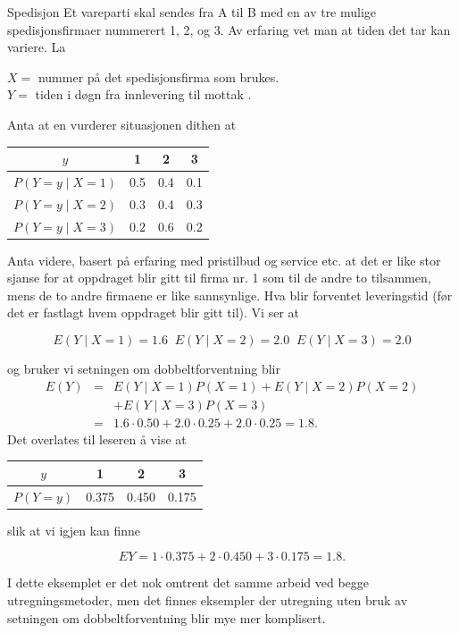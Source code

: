 \begin{eksempel}{Spedisjon}
Et vareparti skal sendes fra A til B med en av tre mulige
spedisjonsfirmaer nummerert 1, 2, og 3. Av erfaring vet man at
tiden det tar kan variere. La

     $X=$ nummer på det spedisjonsfirma som brukes. \\
\indent     $Y=$ tiden i døgn fra innlevering til mottak .

\noindent Anta at en vurderer situasjonen dithen at

\begin{center}
\begin{tabular}{c|ccc}
  $y$& 1 & 2 & 3 \\ \hline
 $P(Y=y \mid X=1)$&0.5&0.4&0.1 \\
 $P(Y=y \mid X=2)$&0.3&0.4&0.3 \\
 $P(Y=y \mid X=3)$&0.2&0.6&0.2 
\end{tabular}
\end{center}
\noindent Anta videre, basert på erfaring med pristilbud og service etc. at
det er like stor sjanse for at oppdraget blir gitt til firma nr.
1 som til de andre to tilsammen, mens de to andre firmaene er
like sannsynlige. Hva blir forventet leveringstid (før det er
fastlagt hvem oppdraget blir gitt til). Vi ser at

\[ E(Y\mid X=1)=1.6 \; \; E(Y\mid X=2)=2.0 \; \; E(Y\mid X=3)=2.0 \]

\noindent og bruker vi setningen om dobbeltforventning blir
\begin{eqnarray*}
E(Y) &=& E(Y\mid X=1)P(X=1)+E(Y\mid X=2)P(X=2) \\
     & & + E(Y\mid X=3)P(X=3) \\
     &=&1.6\cdot 0.50 + 2.0\cdot 0.25 + 2.0\cdot 0.25 = 1.8.
\end{eqnarray*}
\noindent Det overlates til leseren å vise at
\begin{center}
 \begin{tabular}{c|ccc}
 $y$& 1 & 2 & 3 \\ \hline
 $P(Y=y)$ & 0.375 & 0.450 & 0.175
\end{tabular}
\end{center}
\noindent slik at vi igjen kan finne

\[ EY=1\cdot 0.375 + 2\cdot 0.450 + 3\cdot 0.175 = 1.8. \]

\noindent I dette eksemplet er det nok omtrent det samme arbeid ved begge
utregningsmetoder, men det finnes eksempler der utregning uten
bruk av setningen om dobbeltforventning blir mye mer komplisert.
\end{eksempel}

